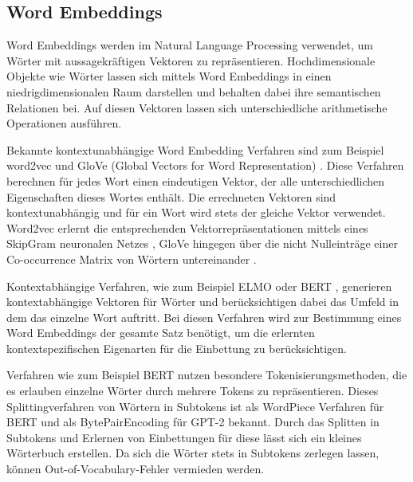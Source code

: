 \subsection{Word Embeddings}
Word Embeddings werden im Natural Language Processing verwendet, um Wörter mit aussagekräftigen Vektoren zu repräsentieren. 
Hochdimensionale Objekte wie Wörter lassen sich mittels Word Embeddings in einen niedrigdimensionalen Raum darstellen und behalten dabei ihre semantischen Relationen bei. 
Auf diesen Vektoren lassen sich unterschiedliche arithmetische Operationen ausführen.

Bekannte kontextunabhängige Word Embedding Verfahren sind zum Beispiel word2vec \citep{word2vec} und GloVe (Global Vectors for Word Representation) \citep{glove}. 
Diese Verfahren berechnen für jedes Wort einen eindeutigen Vektor, der alle unterschiedlichen Eigenschaften dieses Wortes enthält.
Die errechneten Vektoren sind kontextunabhängig und für ein Wort wird stets der gleiche Vektor verwendet. 
Word2vec erlernt die entsprechenden Vektorrepräsentationen mittels eines SkipGram neuronalen Netzes \citep{word2vec}, GloVe hingegen über die nicht Nulleinträge einer Co-occurrence Matrix von Wörtern untereinander \citep{glove}. 

Kontextabhängige Verfahren, wie zum Beispiel ELMO \citep{elmo} oder BERT \citep{DBLP:journals/corr/abs-1810-04805}, generieren kontextabhängige Vektoren für Wörter und berücksichtigen dabei das Umfeld in dem das einzelne Wort auftritt.
Bei diesen Verfahren wird zur Bestimmung eines Word Embeddings der gesamte Satz benötigt, um die erlernten kontextspezifischen Eigenarten für die Einbettung zu berücksichtigen. 

Verfahren wie zum Beispiel BERT nutzen besondere Tokenisierungsmethoden, die es erlauben einzelne Wörter durch mehrere Tokens zu repräsentieren.
Dieses Splittingverfahren von Wörtern in Subtokens ist als WordPiece Verfahren \citep{wordpiece} für BERT und als BytePairEncoding \citep{bytepairencoding} für GPT-2 bekannt. 
Durch das Splitten in Subtokens und Erlernen von Einbettungen für diese lässt sich ein kleines Wörterbuch erstellen. 
Da sich die Wörter stets in Subtokens zerlegen lassen, können Out-of-Vocabulary-Fehler vermieden werden.

